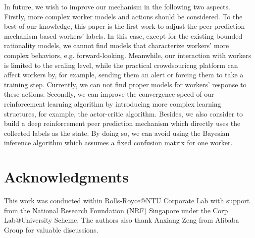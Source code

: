 \documentclass[letterpaper]{article} %
\begin{document}
In future, we wish to improve our mechanism in the following two aspects.
Firstly, more complex worker models and actions should be considered.
To the best of our knowledge, this paper is the first work to adjust the peer prediction mechanism based workers' labels.
In this case, except for the existing bounded rationality models, we cannot find models that characterize workers' more complex behaviors, e.g. forward-looking.
Meanwhile, our interaction with workers is limited to the scaling level, while the practical crowdsouricng platform can affect workers by, for example, sending them an alert or forcing them to take a training step.
Currently, we can not find proper models for workers' response to these actions.
Secondly, we can improve the convergence speed of our reinforcement learning algorithm by introducing more complex learning structures, for example, the actor-critic algorithm.
Besides, we also consider to build a deep reinforcement peer prediction mechanism which directly uses the collected labels as the state.
By doing so, we can avoid using the Bayesian inference algorithm which assumes a fixed confusion matrix for one worker.

\section*{Acknowledgments}
This work was conducted within Rolls-Royce@NTU Corporate Lab
with support from the National Research Foundation (NRF) Singapore
under the Corp Lab@University Scheme. The authors also thank Anxiang Zeng from Alibaba Group for valuable discussions.



\end{document}
